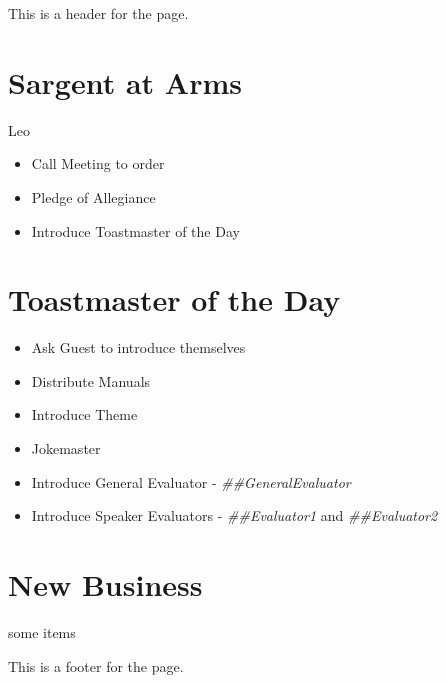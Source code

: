 \documentclass{article}
\begin{document}
This is a header for the page.

\section{Sargent at Arms} Leo
\begin{itemize}
	\item Call Meeting to order
	\item Pledge of Allegiance
	\item Introduce Toastmaster of the Day
\end{itemize}

\section{Toastmaster of the Day}
\begin{itemize}
	\item Ask Guest to introduce themselves
	\item Distribute Manuals
	\item Introduce Theme
	\item Jokemaster
	\item Introduce General Evaluator - \textit{##GeneralEvaluator}
	\item Introduce Speaker Evaluators - \textit{##Evaluator1} and \textit{##Evaluator2}
\end{itemize}

\section{New Business}
\begin{items}
	\item some items
\end{items}


This is a footer for the page.
\end{document}
